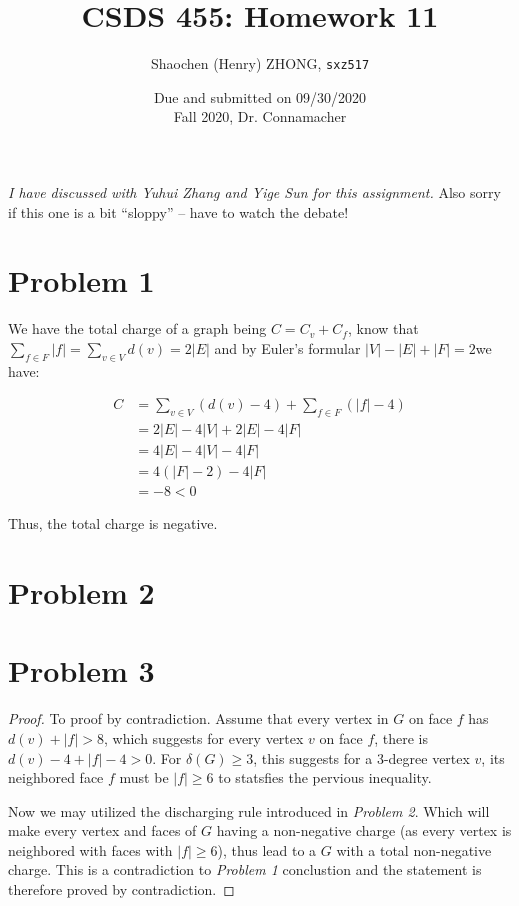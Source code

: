 \documentclass[11pt]{article}
\newcommand{\ilc}{\texttt}
\begin{document}
\title{\textbf{CSDS 455: Homework 11}}

\author{Shaochen (Henry) ZHONG, \ilc{sxz517}}
\date{Due and submitted on 09/30/2020 \\ Fall 2020, Dr. Connamacher}
\maketitle

\textit{I have discussed with Yuhui Zhang and Yige Sun for this assignment.} Also sorry if this one is a bit ``sloppy'' -- have to watch the debate!

\section*{Problem 1}

We have the total charge of a graph being $C = C_v + C_f$, know that $\sum_{f \in F}|f| = \sum_{v \in V} d(v) = 2|E|$ and by Euler's formular $|V| - |E| + |F| = 2$we have:

\begin{align*}
    C &= \sum_{v \in V}(d(v) - 4) + \sum_{f \in F}(|f| - 4) \\
    &= 2|E| - 4|V| + 2|E| - 4|F| \\
    &= 4|E| - 4|V| - 4|F| \\
    &= 4(|F| - 2) - 4|F| \\
    &= -8 < 0
\end{align*}

Thus, the total charge is negative.





\section*{Problem 2}

\section*{Problem 3}

\begin{proof}
    To proof by contradiction. Assume that every vertex in $G$ on face $f$ has $d(v) + |f| > 8$, which suggests for every vertex $v$ on face $f$, there is $d(v) - 4 + |f| - 4 > 0$. For $\delta(G) \geq 3$, this suggests for a 3-degree vertex $v$, its neighbored face $f$ must be $|f| \geq 6$ to statsfies the pervious inequality.

    Now we may utilized the discharging rule introduced in \textit{Problem 2}. Which will make every vertex and faces of $G$ having a non-negative charge (as every vertex is neighbored with faces with $|f| \geq 6$), thus lead to a $G$ with a total non-negative charge. This is a contradiction to \textit{Problem 1} conclustion and the statement is therefore proved by contradiction.
\end{proof}

%
% 
% 
\end{document}
